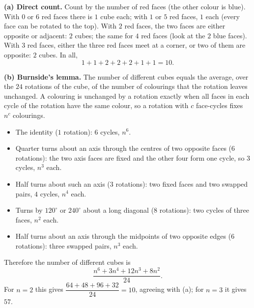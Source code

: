 \textbf{(a) Direct count.} Count by the number of red faces (the other colour is blue). With $0$ or $6$ red faces there is $1$ cube each; with $1$ or $5$ red faces, $1$ each (every face can be rotated to the top). With $2$ red faces, the two faces are either opposite or adjacent: $2$ cubes; the same for $4$ red faces (look at the $2$ blue faces). With $3$ red faces, either the three red faces meet at a corner, or two of them are opposite: $2$ cubes. In all,
\[
1+1+2+2+2+1+1=\boxed{10}.
\]

\textbf{(b) Burnside's lemma.} The number of different cubes equals the average, over the $24$ rotations of the cube, of the number of colourings that the rotation leaves unchanged. A colouring is unchanged by a rotation exactly when all faces in each cycle of the rotation have the same colour, so a rotation with $c$ face-cycles fixes $n^c$ colourings.
\begin{itemize}
\item The identity ($1$ rotation): $6$ cycles, $n^6$.
\item Quarter turns about an axis through the centres of two opposite faces ($6$ rotations): the two axis faces are fixed and the other four form one cycle, so $3$ cycles, $n^3$ each.
\item Half turns about such an axis ($3$ rotations): two fixed faces and two swapped pairs, $4$ cycles, $n^4$ each.
\item Turns by $120^\circ$ or $240^\circ$ about a long diagonal ($8$ rotations): two cycles of three faces, $n^2$ each.
\item Half turns about an axis through the midpoints of two opposite edges ($6$ rotations): three swapped pairs, $n^3$ each.
\end{itemize}
Therefore the number of different cubes is
\[
\boxed{\dfrac{n^6+3n^4+12n^3+8n^2}{24}}.
\]
For $n=2$ this gives $\dfrac{64+48+96+32}{24}=10$, agreeing with (a); for $n=3$ it gives $57$.
